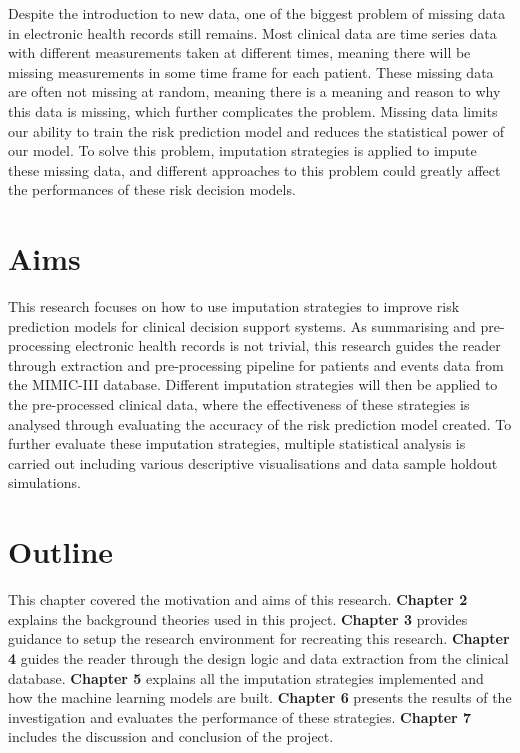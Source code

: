 \documentclass{l4proj}
\begin{document}
 Despite the introduction to new data, one of the biggest problem of missing data in electronic health records still remains. Most clinical data are time series data with different measurements taken at different times, meaning there will be missing measurements in some time frame for each patient. These missing data are often not missing at random, meaning there is a meaning and reason to why this data is missing, which further complicates the problem. Missing data limits our ability to train the risk prediction model and reduces the statistical power of our model. To solve this problem, imputation strategies is applied to impute these missing data, and different approaches to this problem could greatly affect the performances of these risk decision models.


\section{Aims}

This research focuses on how to use imputation strategies to improve risk prediction models for clinical decision support systems. As summarising and pre-processing electronic health records is not trivial, this research guides the reader through extraction and pre-processing pipeline for patients and events data from the MIMIC-III database. Different imputation strategies will then be applied to the pre-processed clinical data, where the effectiveness of these strategies is analysed through evaluating the accuracy of the risk prediction model created. To further evaluate these imputation strategies, multiple statistical analysis is carried out including various descriptive visualisations and data sample holdout simulations. 

\section{Outline}
This chapter covered the motivation and aims of this research. \textbf{Chapter 2} explains the background theories used in this project. \textbf{Chapter 3} provides guidance to setup the research environment for recreating this research. \textbf{Chapter 4} guides the reader through the design logic and data extraction from the clinical database.\textbf{ Chapter 5} explains all the imputation strategies implemented and how the machine learning models are built. \textbf{Chapter 6} presents the results of the investigation  and evaluates the performance of these strategies. \textbf{Chapter 7} includes the discussion and conclusion of the project.
\end{document}
